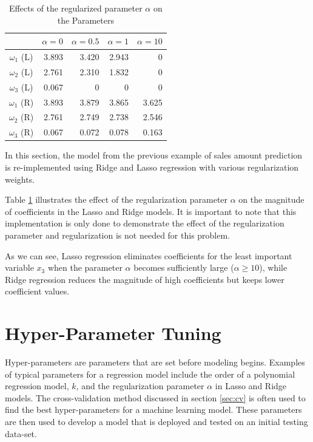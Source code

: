 {\begin{table}[!ht]
\centering
\begin{tabular}{|c|r|r|r|r|}
  \hline
               & $\alpha = 0$  & $\alpha = 0.5$ & $\alpha = 1$ & $\alpha = 10$ \\
  \hline
  $\omega_1$ (L) & 3.893 & 3.420 & 2.943 & 0 \\
  $\omega_2$ (L) & 2.761 & 2.310 & 1.832 & 0 \\
  $\omega_3$ (L) & 0.067 & 0 & 0 & 0 \\
  \hline
  \hline
  $\omega_1$ (R) & 3.893 & 3.879 & 3.865 & 3.625 \\
  $\omega_2$ (R) & 2.761 & 2.749 & 2.738 & 2.546 \\
  $\omega_3$ (R) & 0.067 & 0.072 & 0.078 & 0.163 \\
  \hline
  \hline
\end{tabular}
\caption{Effects of the regularized parameter $\alpha$  on the Parameters}\label{tb:regular}
\end{table}

In this section, the model from the previous example of sales amount prediction is re-implemented using Ridge and Lasso regression with various regularization weights.

Table \ref{tb:regular} illustrates the effect of the regularization parameter $\alpha$ on the magnitude of coefficients in the Lasso and Ridge models. It is important to note that this implementation is only done to demonstrate the effect of the regularization parameter and regularization is not needed for this problem.

As we can see, Lasso regression eliminates coefficients for the least important variable $x_3$ when the parameter $\alpha$ becomes sufficiently large ($\alpha \geq 10$), while Ridge regression reduces the magnitude of high coefficients but keeps lower coefficient values.

\newpage
\section{Hyper-Parameter Tuning}\label{sec:hyperP}
Hyper-parameters are parameters that are set before modeling begins. Examples of typical parameters for a regression model include the order of a polynomial regression model, $k$, and the regularization parameter $\alpha$ in Lasso and Ridge models. The cross-validation method discussed in section \ref{sec:cv} is often used to find the best hyper-parameters for a machine learning model. These parameters are then used to develop a model that is deployed and tested on an initial testing data-set.

}
